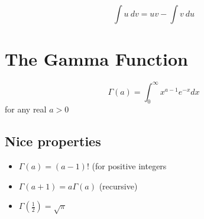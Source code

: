 \documentclass{article}
\begin{document}
\begin{displaymath}
\int u\ dv = uv - \int v\ du
\end{displaymath}

\section{The Gamma Function}

\begin{displaymath}
\Gamma (a) = \int_0^{\infty} x^{a-1} e^{-x} dx
\end{displaymath}
for any real $a>0$

\subsection{Nice properties}

\begin{itemize}
\item[] $\Gamma (a) = (a-1)!$ (for positive integers
\item[] $\Gamma(a+1) = a \Gamma(a)$ (recursive)
\item[] $\Gamma(\frac{1}{2}) = \sqrt{\pi}$
\end{itemize}
\end{document}
